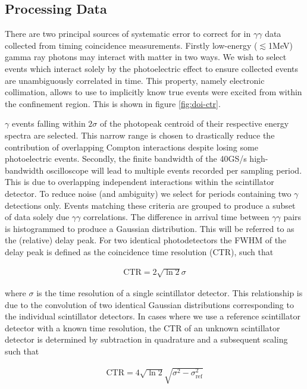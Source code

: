 \subsection{Processing Data}
There are two principal sources of systematic error to correct for in $\gamma\gamma$ data collected from timing coincidence measurements. Firstly low-energy ($\lesssim$1MeV) gamma ray photons may interact with matter in two ways. We wish to select events which interact solely by the photoelectric effect to ensure collected events are unambiguously correlated in time. This property, namely electronic collimation, allows to use to implicitly know true events were excited from within the confinement region. This is shown in figure \ref{fig:doi-ctr}.

$\gamma$ events falling within $2\sigma$ of the photopeak centroid of their respective energy spectra are selected. This narrow range is chosen to drastically reduce the contribution of overlapping Compton interactions despite losing some photoelectric events. Secondly, the finite bandwidth of the 40GS/s high-bandwidth oscilloscope will lead to multiple events recorded per sampling period. This is due to overlapping independent interactions within the scintillator detector. To reduce noise (and ambiguity) we select for periods containing two $\gamma$ detections only. Events matching these criteria are grouped to produce a subset of data solely due $\gamma\gamma$ correlations. The difference in arrival time between $\gamma\gamma$ pairs is histogrammed to produce a Gaussian distribution. This will be referred to as the (relative) delay peak. For two identical photodetectors the FWHM of the delay peak is defined as the coincidence time resolution (CTR), such that

\begin{align}
\text{CTR} = 2\sqrt{\ln{2}}\sigma
\end{align}

where $\sigma$ is the time resolution of a single scintillator detector. This relationship is due to the convolution of two identical Gaussian distributions corresponding to the individual scintillator detectors. In cases where we use a reference scintillator detector with a known time resolution, the CTR of an unknown scintillator detector is determined by subtraction in quadrature and a subsequent scaling such that

\begin{align}
\text{CTR} = 4\sqrt{\ln{2}}\sqrt{\sigma^2-\sigma_\textrm{ref}^2}
\end{align}

